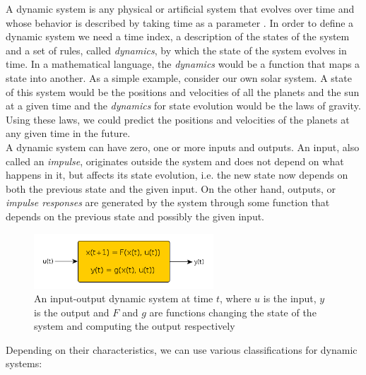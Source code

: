 \documentclass[a4paper,11pt,twoside]{report}
\begin{document}
A dynamic system is any physical or artificial system that evolves over time and whose behavior is described by taking time as a parameter \cite{luenberger1979introduction}. In order to define a dynamic system we need a time index, a description of the states of the system and a set of rules, called \textit{dynamics}, by which the state of the system evolves in time. In a mathematical language, the \textit{dynamics} would be a function that maps a state into another. As a simple example, consider our own solar system. A state of this system would be the positions and velocities of all the planets and the sun at a given time and the \textit{dynamics} for state evolution would be the laws of gravity. Using these laws, we could predict the positions and velocities of the planets at any given time in the future.\\

A dynamic system can have zero, one or more inputs and outputs. An input, also called an \textit{impulse}, originates outside the system and does not depend on what happens in it, but affects its state evolution, i.e. the new state now depends on both the previous state and the given input. On the other hand, outputs, or \textit{impulse responses} are generated by the system through some function that depends on the previous state and possibly the given input. 

\begin{figure}[h]
\centering
\includegraphics[width=0.6\textwidth]{../figures/dynamic_system.png}
\caption{An input-output dynamic system at time $t$, where $u$ is the input, $y$ is the output and $F$ and $g$ are functions changing the state of the system and computing the output respectively}
\label{fig:dynamic_system}
\end{figure}

Depending on their characteristics, we can use various classifications for dynamic systems:
\end{document}
